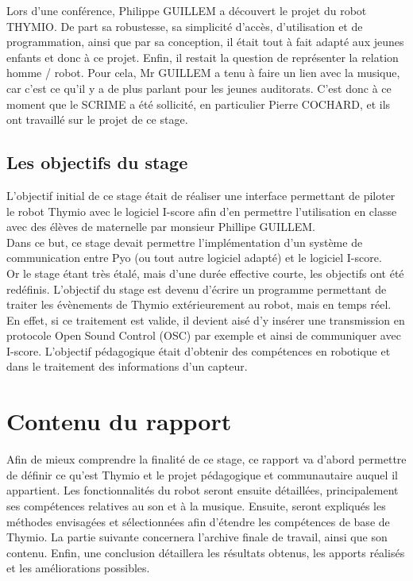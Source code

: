 \documentclass[a4paper, 12pt]{report}
\begin{document}
Lors d'une conférence, Philippe GUILLEM a découvert le projet du robot THYMIO. De part sa robustesse, sa simplicité d'accès, d'utilisation et de programmation, ainsi que par sa conception, il était tout à fait adapté aux jeunes enfants et donc à ce projet.
Enfin, il restait la question de représenter la relation homme / robot. Pour cela, Mr GUILLEM a tenu à faire un lien avec la musique, car c'est ce qu'il y a de plus parlant pour les jeunes auditorats. C'est donc à ce moment que le SCRIME a été sollicité, en particulier Pierre COCHARD, et ils ont travaillé sur le projet de ce stage.


\subsection{Les objectifs du stage}
L'objectif initial de ce stage était de réaliser une interface permettant de piloter le robot Thymio avec le logiciel I-score afin d'en permettre l'utilisation en classe avec des élèves de maternelle par monsieur Phillipe GUILLEM. \\
Dans ce but, ce stage devait permettre l'implémentation d'un système de communication entre Pyo (ou tout autre logiciel adapté) et le logiciel I-score.\\
Or le stage étant très étalé, mais d'une durée effective courte, les objectifs ont été redéfinis. L'objectif du stage est devenu d'écrire un programme permettant de traiter les évènements de Thymio extérieurement au robot, mais en temps réel. En effet, si ce traitement est valide, il devient aisé d'y insérer une transmission en protocole Open Sound Control (OSC) par exemple et ainsi de communiquer avec I-score.
L'objectif pédagogique était d'obtenir des compétences en robotique et dans le traitement des informations d'un capteur. 

\section{Contenu du rapport}
Afin de mieux comprendre la finalité de ce stage, ce rapport va d'abord permettre de définir ce qu'est Thymio et le projet pédagogique et communautaire auquel il appartient. 
Les fonctionnalités du robot seront ensuite détaillées, principalement ses compétences relatives au son et à la musique. Ensuite, seront expliqués les méthodes envisagées et sélectionnées afin d'étendre les compétences de base de Thymio. 
La partie suivante concernera l'archive finale de travail, ainsi que son contenu.
Enfin, une conclusion détaillera les résultats obtenus, les apports réalisés et les améliorations possibles.
\end{document}
